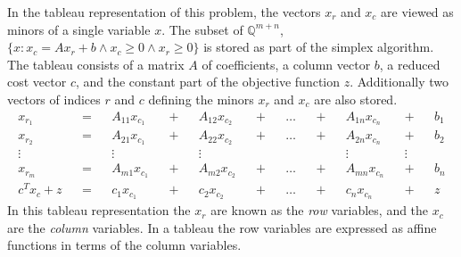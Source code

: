 \documentclass[11pt]{article} %
\begin{document}
In the tableau representation of this problem, the vectors $x_r$ and $x_c$ are viewed as minors of a single variable $x$. The subset of $\mathbb{Q}^{m+n}$, $\{x : x_c = Ax_r + b \wedge x_c \ge 0 \wedge x_r \ge 0\}$ is stored as part of the simplex algorithm. The tableau consists of a matrix $A$ of coefficients, a column vector $b$, a reduced cost vector $c$, and the constant part of the objective function $z$. Additionally two vectors of indices $r$ and $c$ defining the minors $x_r$ and $x_c$ are also stored.
\begin{equation}
  \begin{aligned}
    x_{r_1} && = && A_{11}x_{c_1} && + && A_{12}x_{c_2} && + && \dots && + && A_{1n}x_{c_n} && + && b_1 \\
    x_{r_2} && = && A_{21}x_{c_1} && + && A_{22}x_{c_2} && + && \dots && + && A_{2n}x_{c_n} && + && b_2 \\
    \vdots && && \vdots && && \vdots && && && && \vdots && \vdots \\
    x_{r_m} && = && A_{m1}x_{c_1} && + && A_{m2}x_{c_2} && + && \dots && + && A_{mn}x_{c_n} && + && b_n \\
    c^Tx_c + z && = && c_1x_{c_1} && + && c_2x_{c_2} && + && \dots && + && c_nx_{c_n} && + && z
  \end{aligned}
\end{equation}
In this tableau representation the $x_r$ are known as the \textit{row} variables, and the $x_c$ are the \textit{column} variables. In a tableau the row variables are expressed as affine functions in terms of the column variables.
\end{document}

